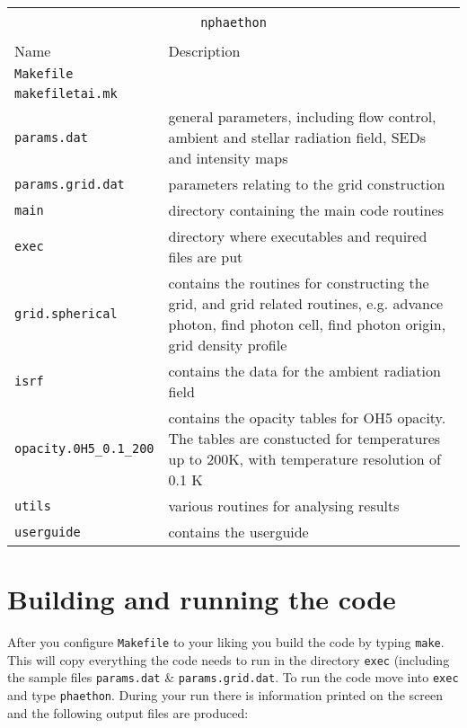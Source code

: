 \documentclass[12pt,a4paper]{article}
\begin{document}
\vspace{1cm}
{\centering 
\begin{tabular}{|p{4cm}|p{13.1cm}|}
\hline
\multicolumn{2}{|c|}{}\\ 
\multicolumn{2}{|c|}{\large\texttt{nphaethon}}\\
\multicolumn{2}{|c|}{}\\  
\hline
Name & Description \\
\hline
\texttt{Makefile} & \\
\texttt{makefiletai.mk}&  \\
\texttt{params.dat}& general parameters, including flow control, ambient and stellar radiation field, SEDs and intensity maps\\
\texttt{params.grid.dat}& parameters relating to the grid construction \\
\texttt{main}& directory containing the main code routines\\
\texttt{exec}& directory where executables and required files are put\\
\texttt{grid.spherical}& contains the routines for constructing the grid, and grid related routines, e.g. advance photon, find photon cell, find photon origin, grid density profile \\
\texttt{isrf}& contains the data for the ambient radiation field \\
\texttt{opacity.0H5\_0.1\_200}& contains the opacity tables for OH5 opacity. The tables are constucted for temperatures up to 200K, with temperature resolution of 0.1 K\\
\texttt{utils}& various routines for analysing results\\
\texttt{userguide}& contains the userguide\\
\hline
\end{tabular}
\par}
\vspace{1cm}


\section{Building and running the code}

After you configure \texttt{Makefile} to your liking you  build the code by typing
{\texttt{make}}. This will copy everything the code needs to run in the directory {\texttt{exec}} (including the sample files \texttt{params.dat} \& \texttt{params.grid.dat}. To run the code move into {\texttt{exec}} and type \texttt{phaethon}. During your run there is information printed on the screen and the following output files are produced:
\end{document}
